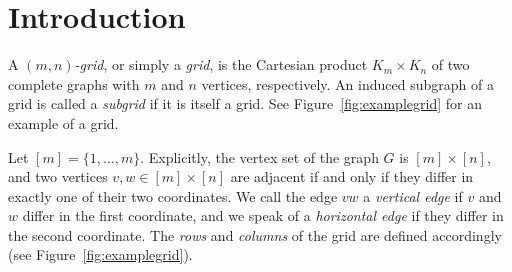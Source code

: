 \documentclass[runningheads,a4paper]{llncs}
\begin{document}
\section{Introduction}
A \emph{$(m,n)$-grid}, or simply a \emph{grid}, is the Cartesian product $K_m \times K_n$ of two complete graphs with $m$ and $n$ vertices, respectively. An induced subgraph of a grid is called a \emph{subgrid} if it is itself a grid.
See Figure~\ref{fig:examplegrid} for an example of a grid.

Let $[m] = \{1,\ldots,m\}$.
Explicitly, the vertex set of the graph $G$ is $[m] \times [n]$, and two
vertices $v,w \in [m] \times [n]$ are adjacent if and only if they differ in
exactly one of their two coordinates.
We call the edge $vw$ a \emph{vertical edge} if $v$ and $w$ differ in the
first coordinate, and we speak of a \emph{horizontal edge} if they differ in the
second coordinate. The \emph{rows} and \emph{columns} of the grid are defined accordingly (see Figure~\ref{fig:examplegrid}).
\end{document}
